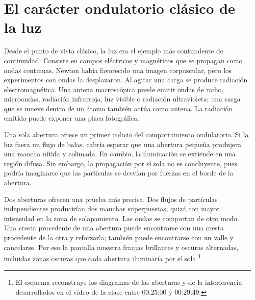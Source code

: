 \section{El carácter ondulatorio clásico de la luz}

Desde el punto de vista clásico, la luz era el ejemplo más contundente de continuidad. Consiste en campos eléctricos y magnéticos que se propagan como ondas continuas. Newton había favorecido una imagen corpuscular, pero los experimentos con ondas la desplazaron. Al agitar una carga se produce radiación electromagnética. Una antena macroscópica puede emitir ondas de radio, microondas, radiación infrarroja, luz visible o radiación ultravioleta; una carga que se mueve dentro de un átomo también actúa como antena. La radiación emitida puede exponer una placa fotográfica.

Una sola abertura ofrece un primer indicio del comportamiento ondulatorio. Si la luz fuera un flujo de balas, cabría esperar que una abertura pequeña produjera una mancha nítida y colimada. En cambio, la iluminación se extiende en una región difusa. Sin embargo, la propagación por sí sola no es concluyente, pues podría imaginarse que las partículas se desvían por fuerzas en el borde de la abertura.

Dos aberturas ofrecen una prueba más precisa. Dos flujos de partículas independientes producirían dos manchas superpuestas, quizá con mayor intensidad en la zona de solapamiento. Las ondas se comportan de otro modo. Una cresta procedente de una abertura puede encontrarse con una cresta procedente de la otra y reforzarla; también puede encontrarse con un valle y cancelarse. Por eso la pantalla muestra franjas brillantes y oscuras alternadas, incluidas zonas oscuras que cada abertura iluminaría por sí sola.\footnote{El esquema reconstruye los diagramas de las aberturas y de la interferencia desarrollados en el vídeo de la clase entre 00:25:00 y 00:29:49.}

